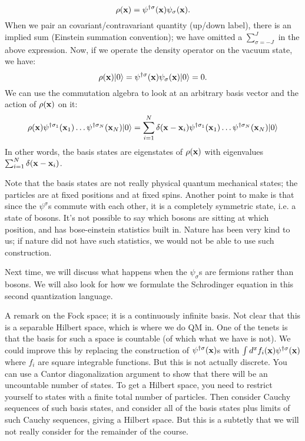 \begin{equation}
    \rho(\mathbf{x}) = \psi^{\dagger\sigma}(\mathbf{x})\psi_\sigma(\mathbf{x}).
\end{equation}
When we pair an covariant/contravariant quantity (up/down label), there is an implied sum (Einstein summation convention); we have omitted a $\sum_{\sigma=-J}^J$ in the above expression. Now, if we operate the density operator on the vacuum state, we have:
\begin{equation}
    \rho(\mathbf{x})\lvert 0 \rangle = \psi^{\dagger\sigma}(\mathbf{x})\psi_\sigma(\mathbf{x})\lvert 0 \rangle = 0.
\end{equation}
We can use the commutation algebra to look at an arbitrary basis vector and the action of $\rho(\mathbf{x})$ on it:
\begin{equation}
    \rho(\mathbf{x})\psi^{\dagger\sigma_1}(\mathbf{x}_1)\ldots \psi^{\dagger\sigma_N}(\mathbf{x}_N)\lvert 0 \rangle = \sum_{i=1}^N \delta(\mathbf{x} - \mathbf{x}_i)\psi^{\dagger\sigma_1}(\mathbf{x}_1)\ldots \psi^{\dagger\sigma_N}(\mathbf{x}_N)\lvert 0 \rangle
\end{equation}
In other words, the basis states are eigenstates of $\rho(\mathbf{x})$ with eigenvalues $\sum_{i=1}^N \delta(\mathbf{x} - \mathbf{x}_i)$. 

Note that the basis states are not really physical quantum mechanical states; the particles are at fixed positions and at fixed spins. Another point to make is that since the $\psi^{\sigma}$s commute with each other, it is a completely symmetric state, i.e. a state of bosons. It's not possible to say which bosons are sitting at which position, and has bose-einstein statistics built in. Nature has been very kind to us; if nature did not have such statistics, we would not be able to use such construction.

Next time, we will discuss what happens when the $\psi_\sigma$s are fermions rather than bosons. We will also look for how we formulate the Schrodinger equation in this second quantization language.

A remark on the Fock space; it is a continuously infinite basis. Not clear that this is a separable Hilbert space, which is where we do QM in. One of the tenets is that the basis for such a space is countable (of which what we have is not). We could improve this by replacing the construction of $\psi^{\dagger\sigma}(\mathbf{x})$s with $\int d^x f_i(\mathbf{x})\psi^{\dagger\sigma}(\mathbf{x})$ where $f_i$ are square integrable functions. But this is not actually discrete. You can use a Cantor diagonalization argument to show that there will be an uncountable number of states. To get a Hilbert space, you need to restrict yourself to states with a finite total number of particles. Then consider Cauchy sequences of such basis states, and consider all of the basis states plus limits of such Cauchy sequences, giving a Hilbert space. But this is a subtetly that we will not really consider for the remainder of the course.